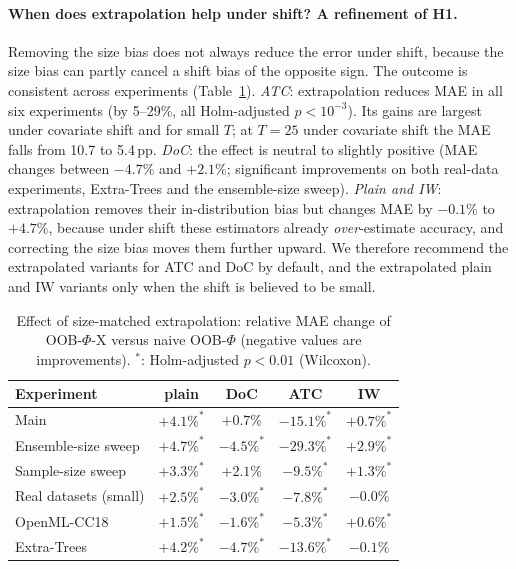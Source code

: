 \paragraph{When does extrapolation help under shift? A refinement of H1.}
Removing the size bias does not always reduce the error under shift, because the size bias can partly cancel a shift bias of the opposite sign. The outcome is consistent across experiments (Table~\ref{tab:x}).
\emph{ATC}: extrapolation reduces MAE in all six experiments (by 5--29\%, all Holm-adjusted $p<10^{-3}$). Its gains are largest under covariate shift and for small $T$; at $T=25$ under covariate shift the MAE falls from 10.7 to 5.4\,pp.
\emph{DoC}: the effect is neutral to slightly positive (MAE changes between $-4.7\%$ and $+2.1\%$; significant improvements on both real-data experiments, Extra-Trees and the ensemble-size sweep).
\emph{Plain and IW}: extrapolation removes their in-distribution bias but changes MAE by $-0.1\%$ to $+4.7\%$, because under shift these estimators already \emph{over}-estimate accuracy, and correcting the size bias moves them further upward.
We therefore recommend the extrapolated variants for ATC and DoC by default, and the extrapolated plain and IW variants only when the shift is believed to be small.

\begin{table}[t]
\centering\small
\caption{Effect of size-matched extrapolation: relative MAE change of OOB-$\Phi$-X versus naive OOB-$\Phi$ (negative values are improvements). $^{*}$: Holm-adjusted $p<0.01$ (Wilcoxon).}
\label{tab:x}
\begin{tabular}{lcccc}
\toprule
Experiment & plain & DoC & ATC & IW\\
\midrule
Main & $+4.1\%^{*}$ & $+0.7\%$ & $-15.1\%^{*}$ & $+0.7\%^{*}$\\
Ensemble-size sweep & $+4.7\%^{*}$ & $-4.5\%^{*}$ & $-29.3\%^{*}$ & $+2.9\%^{*}$\\
Sample-size sweep & $+3.3\%^{*}$ & $+2.1\%$ & $-9.5\%^{*}$ & $+1.3\%^{*}$\\
Real datasets (small) & $+2.5\%^{*}$ & $-3.0\%^{*}$ & $-7.8\%^{*}$ & $-0.0\%$\\
OpenML-CC18 & $+1.5\%^{*}$ & $-1.6\%^{*}$ & $-5.3\%^{*}$ & $+0.6\%^{*}$\\
Extra-Trees & $+4.2\%^{*}$ & $-4.7\%^{*}$ & $-13.6\%^{*}$ & $-0.1\%$\\
\bottomrule
\end{tabular}
\end{table}

